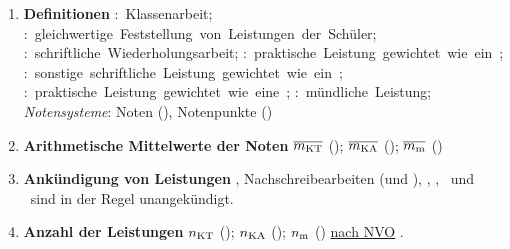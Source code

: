 \begin{enumerate}[label=\textbf{(\arabic*)}, align=left, leftmargin=*]
	\item \textbf{Definitionen} { \thisfontsize \mbox{\textbf{}: Klassenarbeit}; \mbox{\textbf{}: gleichwertige Feststellung von Leistungen der Schüler}; \mbox{\textbf{}: schriftliche Wiederholungsarbeit};  \linebreak \mbox{\textbf{}: praktische Leistung gewichtet wie ein }; \mbox{\textbf{}: sonstige schriftliche Leistung gewichtet wie ein }; \mbox{\textbf{}: praktische Leistung gewichtet wie eine }; \linebreak {}  \mbox{\textbf{}: mündliche Leistung}; \textit{Notensysteme}: Noten (\textbf{}), Notenpunkte (\textbf{}) }
	
	\item \textbf{Arithmetische Mittelwerte der Noten}  { \thisfontsize $\overline{m_{\mathrm{KT}}}$ (\catkt); $\overline{m_{\mathrm{KA}}}$ (\catka); $\overline{m_{\mathrm{m}}}$ (\catm) }
	
	
	\item \textbf{Ankündigung von Leistungen} { \thisfontsize {}, Nachschreibearbeiten ( und ), , , ~und ~sind in der Regel unangekündigt.}
	\item \textbf{Anzahl der Leistungen} { \thisfontsize $n_{\mathrm{KT}}$ (\catkt); $n_{\mathrm{KA}}$ (\catka); $n_{\mathrm{m}}$ (\catm) \href{\nvourl}{nach NVO} \cite{nvo}}.
	

\end{enumerate}
